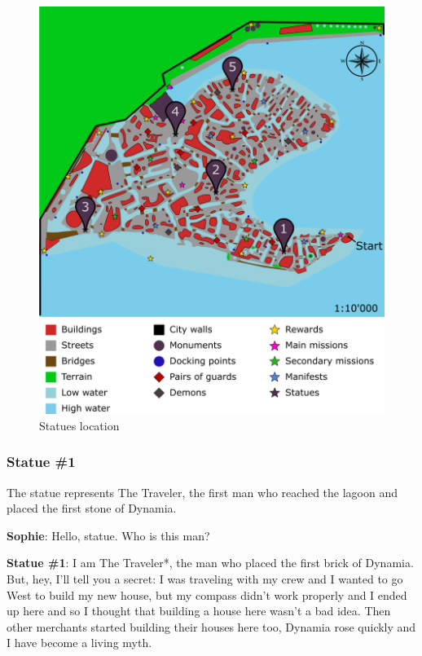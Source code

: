 \begin{figure}[H]
  \centering
  \includegraphics[width=\textwidth]{../Images/Maps/dynamiaSecondaryMissions_Statues}
  \caption{Statues location}
\end{figure}

\subsubsection*{Statue \#{}1}
The statue represents The Traveler, the first man who reached the lagoon and placed the first stone of Dynamia.

\textbf{Sophie}: Hello, statue. Who is this man?

\textbf{Statue \#{}1}: I am The Traveler*, the man who placed the first brick of Dynamia. But, hey, I'll tell you a secret: I was traveling with my crew and I wanted to go West to build my new house, but my compass didn't work properly and I ended up here and so I thought that building a house here wasn't a bad idea. Then other merchants started building their houses here too, Dynamia rose quickly and I have become a living myth.

